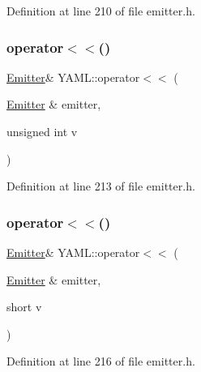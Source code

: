 Definition at line 210 of file emitter.\+h.

\mbox{\label{namespace_y_a_m_l_aa3e4bc35bc3a86babb6f670cd0c3a9d0}} 
\subsubsection{\texorpdfstring{operator$<$$<$()}{operator<<()}\hspace{0.1cm}{\footnotesize\ttfamily [24/35]}}
{\footnotesize\ttfamily \mbox{\hyperlink{class_y_a_m_l_1_1_emitter}{Emitter}}\& Y\+A\+M\+L\+::operator$<$$<$ (\begin{DoxyParamCaption}\item[{\mbox{\hyperlink{class_y_a_m_l_1_1_emitter}{Emitter}} \&}]{emitter,  }\item[{unsigned int}]{v }\end{DoxyParamCaption})\hspace{0.3cm}{\ttfamily [inline]}}



Definition at line 213 of file emitter.\+h.

\mbox{\label{namespace_y_a_m_l_afa9c23df6838345ded374e254ea67532}} 
\subsubsection{\texorpdfstring{operator$<$$<$()}{operator<<()}\hspace{0.1cm}{\footnotesize\ttfamily [25/35]}}
{\footnotesize\ttfamily \mbox{\hyperlink{class_y_a_m_l_1_1_emitter}{Emitter}}\& Y\+A\+M\+L\+::operator$<$$<$ (\begin{DoxyParamCaption}\item[{\mbox{\hyperlink{class_y_a_m_l_1_1_emitter}{Emitter}} \&}]{emitter,  }\item[{short}]{v }\end{DoxyParamCaption})\hspace{0.3cm}{\ttfamily [inline]}}



Definition at line 216 of file emitter.\+h.

\mbox{\label{namespace_y_a_m_l_a1e68113bc51e4a43118b20f203b0c165}} 

